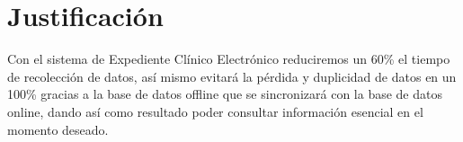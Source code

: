 \label{sec:hipotesis}



\section{Justificación}
\label{sec:justificacion}
Con el sistema de Expediente Clínico Electrónico reduciremos un 60\% el tiempo de recolección de datos, así mismo evitará la pérdida y duplicidad de datos en un 100\% gracias a la base de datos offline que se sincronizará con la base de datos online, dando así como resultado poder consultar información esencial en el momento deseado.
